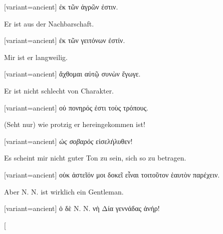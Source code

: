 \switchcolumn

\begin{greek}[variant=ancient]%
ἐκ τῶν ἀγρῶν ἐστιν.

\end{greek}%
\switchcolumn*

Er ist aus der Nachbarschaft. 

\switchcolumn

\begin{greek}[variant=ancient]%
ἐκ τῶν γειτόνων ἐστίν.

\end{greek}%
\switchcolumn*

Mir ist er langweilig. 

\switchcolumn

\begin{greek}[variant=ancient]%
ἄχθομαι αὐτῷ συνὼν ἔγωγε.

\end{greek}%
\switchcolumn*

Er ist nicht schlecht von Charakter. 

\switchcolumn

\begin{greek}[variant=ancient]%
οὐ πονηρός ἐστι τοὺς τρόπους.

\end{greek}%
\switchcolumn*

(Seht nur) wie protzig er hereingekommen ist! 

\switchcolumn

\begin{greek}[variant=ancient]%
\emph{ὡς σοβαρὸς} εἰσελήλυθεν!

\end{greek}%
\switchcolumn*

Es scheint mir nicht guter Ton zu sein, sich so zu betragen. 

\switchcolumn

\begin{greek}[variant=ancient]%
οὐκ ἀστεῖόν μοι δοκεῖ εἶναι τοιτοῦτον ἑαυτὸν παρέχειν.

\end{greek}%
\switchcolumn*

Aber N. N. ist wirklich ein Gentleman. 

\switchcolumn

\begin{greek}[variant=ancient]%
ὁ δὲ Ν. Ν. νὴ Δία γεννάδας ἀνήρ!

\end{greek}%
\switchcolumn*[


